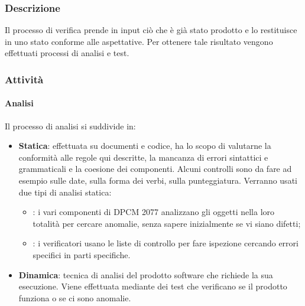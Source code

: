     	\subsubsection{Descrizione}
		Il processo di verifica prende in input ciò che è già stato prodotto e lo restituisce in uno stato conforme alle aspettative. Per ottenere tale risultato vengono effettuati processi di analisi e test.
		\subsubsection{Attività}
			\paragraph{Analisi}
			Il processo di analisi si suddivide in:
			\begin{itemize}
			\item \textbf{Statica}: effettuata su documenti e codice, ha lo scopo di valutarne la conformità alle regole qui descritte, la mancanza di errori sintattici e grammaticali e la coesione dei componenti. Alcuni controlli sono da fare ad esempio sulle date, sulla forma dei verbi, sulla punteggiatura. Verranno usati due tipi di analisi statica:
			\begin{itemize}
				\item \textbf{}: i vari componenti di DPCM 2077 analizzano gli oggetti nella loro totalità per cercare anomalie, senza sapere inizialmente se vi siano difetti;
				\item \textbf{}: i verificatori usano le liste di controllo per fare ispezione cercando errori specifici in parti specifiche.
			\end{itemize}
			\item \textbf{Dinamica}: tecnica di analisi del prodotto software che richiede la sua esecuzione. Viene effettuata mediante dei test che verificano se il prodotto funziona o se ci sono anomalie.
			\end{itemize}
